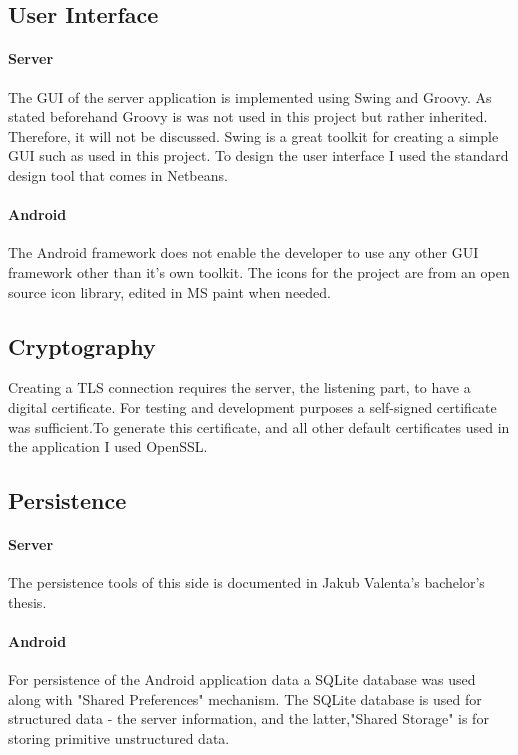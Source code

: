 \documentclass[11pt,twoside,a4paper]{book}
\begin{document}
\subsection{User Interface}
\paragraph{Server}
The GUI of the server application is implemented using Swing and Groovy. As stated beforehand Groovy is was not used in this project but rather inherited. Therefore, it will not be discussed. Swing is a great toolkit for creating a simple GUI such as used in this project. To design the user interface I used the standard design tool that comes in Netbeans.
\paragraph{Android}
The Android framework does not enable the developer to use any other GUI framework other than it's own toolkit. The icons for the project are from an open source icon library\cite{iconsource}, edited in MS paint when needed.

\subsection{Cryptography}
Creating a TLS\cite{tls} connection requires the server, the listening part, to have a digital certificate. For testing and development purposes a self-signed certificate was sufficient.To generate this certificate, and all other default certificates used in the application I used OpenSSL\cite{openssl}.

\subsection{Persistence}
\paragraph{Server} The persistence tools of this side is documented in Jakub Valenta's bachelor's thesis\cite{bakalarkaJV}.
\paragraph{Android}
For persistence of the Android application data a SQLite\cite{sqlite} database was used along with "Shared Preferences"\cite{storage} mechanism. The SQLite database is used for structured data - the server information, and the latter,"Shared Storage" is for storing primitive unstructured data.
\end{document}
